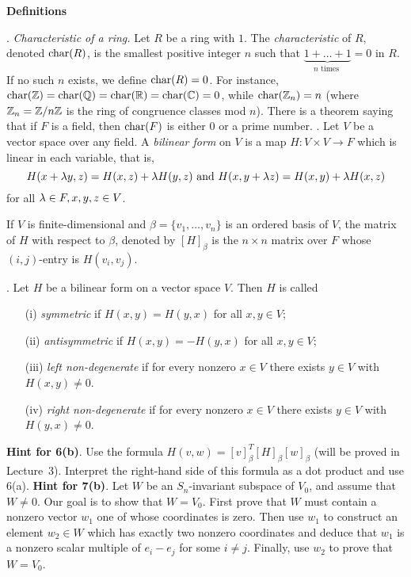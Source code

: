 \documentclass[12pt]{amsart}
\begin{document}
\newpage
\centerline{\bf Definitions}
. {\it Characteristic of a ring.} Let $R$ be a ring with $1$. The \emph{characteristic} of $R$, denoted ${\rm char}(R)$, is the smallest positive integer
$n$ such that $\underbrace{1+\ldots+1}_{n\mbox{ times }}=0$ in $R$. If no such $n$ exists, we define ${\rm char}(R)=0$. For instance, 
${\rm char}({\mathbb Z})={\rm char}({\mathbb Q})={\rm char}({\mathbb R})={\rm char}({\mathbb C})=0$, while ${\rm char}({\mathbb Z}_n)=n$ (where ${\mathbb Z}_n={\mathbb Z}/n{\mathbb Z}$ is the ring of congruence classes mod $n$).
There is a theorem saying that if $F$ is a field, then ${\rm char}(F)$ is either $0$ or a prime number.
. Let $V$ be a vector space over any field. A {\it bilinear form} on $V$ is a map $H:V\times V\to F$
which is linear in each variable, that is,
$$H(x+{\lambda} y, z)=H(x,z)+{\lambda} H (y,z)\mbox { and } H(x,y+{\lambda} z)=H(x,y)+{\lambda} H(x,z)$$
for all ${\lambda}\in F, x,y,z\in V$.

If $V$ is finite-dimensional and $\beta=\{v_1,\ldots, v_n\}$ is an ordered basis of $V$, the matrix of $H$
with respect to $\beta$, denoted by $[H]_{\beta}$ is the $n\times n$ matrix over $F$ whose $(i,j)$-entry is
$H(v_i,v_j)$.

. Let $H$ be a bilinear form on a vector space $V$. Then $H$ is called
\begin{itemize}
\item[(i)] \emph{symmetric} if $H(x,y)=H(y,x)$ for all $x,y\in V$;
\item[(ii)] \emph{antisymmetric} if $H(x,y)= -H(y,x)$ for all $x,y\in V$;
\item[(iii)] \emph{left non-degenerate} if for every nonzero $x\in V$ there exists $y\in V$ with $H(x,y)\neq 0$.
\item[(iv)] \emph{right non-degenerate} if for every nonzero $x\in V$ there exists $y\in V$ with $H(y,x)\neq 0$.
\end{itemize}


\newpage
{\bf Hint for 6(b)}. Use the formula $H(v,w)=[v]_{\beta}^T [H]_{\beta} [w]_{\beta}$ (will be proved in Lecture~3). Interpret the right-hand side of this formula as a dot product and use 6(a).
\newpage
{\bf Hint for 7(b)}. Let $W$ be an $S_n$-invariant subspace of $V_0$, and assume that $W\neq 0$. Our goal is to show that $W=V_0$. First prove that $W$ must contain a nonzero vector $w_1$ one of whose coordinates is zero. Then
use $w_1$ to construct an element $w_2\in W$ which has exactly two nonzero coordinates and deduce that $w_1$
is a nonzero scalar multiple of $e_i-e_j$ for some $i\neq j$. Finally, use $w_2$ to prove that $W=V_0$.
\end{document}

